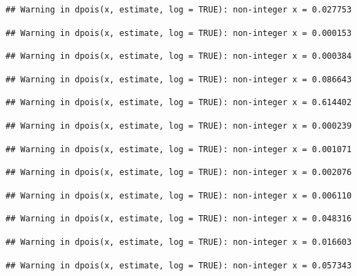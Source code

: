 \documentclass[]{article}
\begin{document}
\begin{verbatim}
## Warning in dpois(x, estimate, log = TRUE): non-integer x = 0.027753
\end{verbatim}

\begin{verbatim}
## Warning in dpois(x, estimate, log = TRUE): non-integer x = 0.000153
\end{verbatim}

\begin{verbatim}
## Warning in dpois(x, estimate, log = TRUE): non-integer x = 0.000384
\end{verbatim}

\begin{verbatim}
## Warning in dpois(x, estimate, log = TRUE): non-integer x = 0.086643
\end{verbatim}

\begin{verbatim}
## Warning in dpois(x, estimate, log = TRUE): non-integer x = 0.614402
\end{verbatim}

\begin{verbatim}
## Warning in dpois(x, estimate, log = TRUE): non-integer x = 0.000239
\end{verbatim}

\begin{verbatim}
## Warning in dpois(x, estimate, log = TRUE): non-integer x = 0.001071
\end{verbatim}

\begin{verbatim}
## Warning in dpois(x, estimate, log = TRUE): non-integer x = 0.002076
\end{verbatim}

\begin{verbatim}
## Warning in dpois(x, estimate, log = TRUE): non-integer x = 0.006110
\end{verbatim}

\begin{verbatim}
## Warning in dpois(x, estimate, log = TRUE): non-integer x = 0.048316
\end{verbatim}

\begin{verbatim}
## Warning in dpois(x, estimate, log = TRUE): non-integer x = 0.016603
\end{verbatim}

\begin{verbatim}
## Warning in dpois(x, estimate, log = TRUE): non-integer x = 0.057343
\end{verbatim}
\end{document}
